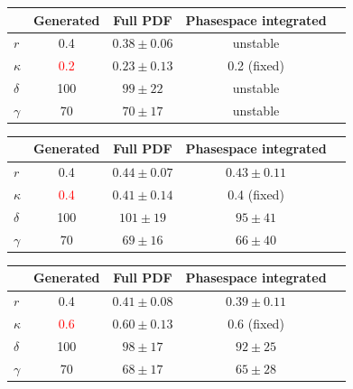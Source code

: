 \documentclass{beamer}
\begin{document}
\begin{frame}[plain]

	\centering	
	\begin{table}[h]
  \scriptsize
  \centering
  \begin{tabular}
    {l c c c c}
    \hline \hline
    & Generated &  Full PDF     &   Phasespace integrated  \\   \hline
	$r$ & 0.4 & $0.38 \pm 0.06$   &  unstable \\
	$\kappa$  & \textcolor{red}{0.2} & $0.23 \pm 0.13$ & 0.2 (fixed)  \\
	$\delta$ & 100 & $99 \pm 22$ &  unstable\\
	$\gamma$ & 70 & $70 \pm 17$  & unstable \\
    \hline \hline
  \end{tabular}
\end{table}

	\begin{table}[h]
  \scriptsize
  \centering
  \begin{tabular}
    {l c c c c}
    \hline \hline
    & Generated &  Full PDF    &   Phasespace integrated  \\   \hline
	$r$ & 0.4 & $0.44 \pm 0.07$      & $0.43 \pm 0.11$  \\
	$\kappa$  & \textcolor{red}{0.4} &$0.41 \pm 0.14$  & 0.4 (fixed)  \\
	$\delta$ & 100 & $101 \pm 19$  & $95 \pm 41$ \\
	$\gamma$ & 70 & $69 \pm 16$   & $66 \pm 40 $ \\
    \hline \hline
  \end{tabular}
\end{table}

	\begin{table}[h]
  \scriptsize
  \centering
  \begin{tabular}
    {l c c c c}
    \hline \hline
    & Generated &  Full PDF    &   Phasespace integrated  \\   \hline
	$r$ & 0.4 & $0.41 \pm 0.08$     & $0.39 \pm 0.11$  \\
	$\kappa$  & \textcolor{red}{0.6} & $0.60 \pm 0.13$  & 0.6 (fixed)  \\
	$\delta$ & 100 & $98 \pm 17$ & $92 \pm 25$ \\
	$\gamma$ & 70 & $68 \pm 17$ & $65 \pm 28$ \\
    \hline \hline
  \end{tabular}
\end{table}


\end{frame}
\end{document}
